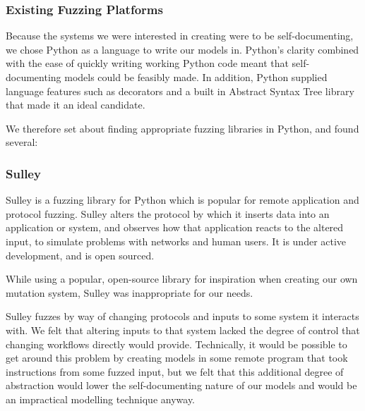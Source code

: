 \documentclass[11pt, twocolumn]{article}
\begin{document}
\subsubsection{Existing Fuzzing Platforms}
\label{research_fuzzing}
Because the systems we were interested in creating were to be self-documenting, we chose Python as a language to write our models in. Python's clarity combined with the ease of quickly writing working Python code meant that self-documenting models could be feasibly made. In addition, Python supplied language features such as decorators and a built in Abstract Syntax Tree library that made it an ideal candidate. \par
We therefore set about finding appropriate fuzzing libraries in Python, and found several:
\subsubsection{Sulley}
\label{fuzzing_sulley}
Sulley is a fuzzing library for Python which is popular for remote application and protocol fuzzing. Sulley alters the protocol by which it inserts data into an application or system, and observes how that application reacts to the altered input, to simulate problems with networks and human users. It is under active development, and is open sourced.\par
While using a popular, open-source library for inspiration when creating our own mutation system, Sulley was inappropriate for our needs.\par
Sulley fuzzes by way of changing protocols and inputs to some system it interacts with. We felt that altering inputs to that system lacked the degree of control that changing workflows directly would provide. Technically, it would be possible to get around this problem by creating models in some remote program that took instructions from some fuzzed input, but we felt that this additional degree of abstraction would lower the self-documenting nature of our models and would be an impractical modelling technique anyway. \par
\end{document}
